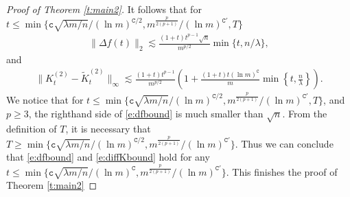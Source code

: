 \documentclass{article}
\numberwithin{equation}{section}
\newcommand{\fc}{{\mathtt c}}
\newcommand{\fC}{{\mathtt C}}
\newcommand{\la}{\lambda}
\renewcommand{\leq}{\leqslant}
\renewcommand{\geq}{\geqslant}
\newcommand{\1}{\mathds{1}}
\theoremstyle{plain} %
\begin{document}
\begin{proof}[Proof of Theorem \ref{t:main2}]
It follows that for $t\leq \min\{\fc \sqrt{\la m/n}/(\ln m)^{\fC/2}, m^{\frac{p}{2(p+1)}}/(\ln m)^{\fC'}, T\}$
\begin{align}\label{e:dfbound}
\|\Delta f(t)\|_2\lesssim \frac{(1+t)t^{p-1}\sqrt n}{m^{p/2}} \min\{t, n/\la\},\end{align}
and 
\begin{align}\label{e:diffKbound}
\|K_t^{(2)}- \tilde K_t^{(2)}  \|_\infty\lesssim 
\frac{(1+t)t^{p-1}}{m^{p/2}}\left(1+\frac{(1+t)t(\ln m)^{\fC}}{m}\min\left\{t, \frac{n}{\la}\right\}\right).
\end{align}
We notice that for $t\leq \min\{\fc \sqrt{\la m/n}/(\ln m)^{\fC/2}, m^{\frac{p}{2(p+1)}}/(\ln m)^{\fC'}, T\}$, and $p\geq 3$, the righthand side of \eqref{e:dfbound} is much smaller than $\sqrt n$. From the definition of $T$, it is necessary that  $T\geq \min\{\fc \sqrt{\la m/n}/(\ln m)^{\fC/2}, m^{\frac{p}{2(p+1)}}/(\ln m)^{\fC'}\}$. Thus we can conclude that \eqref{e:dfbound} and \eqref{e:diffKbound} hold for any $t\leq \min\{\fc \sqrt{\la m/n}/(\ln m)^{\fC}, m^{\frac{p}{2(p+1)}}/(\ln m)^{\fC'}\}$. This finishes the proof of Theorem \ref{t:main2}


\end{proof}
\end{document}

